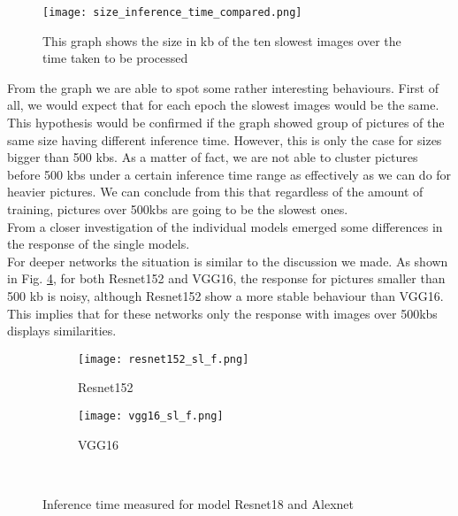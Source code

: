 \begin{figure}[h]
       \centering 
	    \texttt{[image: size\_inference\_time\_compared.png]}
        \caption[Size of the images over inference time]{This graph shows the size in kb of the ten slowest images over the time taken to be processed }
         \label{fig:size_inference_time_compared}
\end{figure}



From the graph we are able to spot some rather interesting behaviours. First of all, we would expect that for each epoch the slowest images would be the same. This hypothesis would be confirmed if the graph showed group of pictures of the same size having different inference time. However, this is only the case for sizes bigger than 500 kbs. As a matter of fact, we are not able to cluster pictures before 500 kbs under a certain inference time range as effectively as we can do for heavier pictures. We can conclude from this that regardless of the amount of training, pictures over 500kbs are going to be the slowest ones. \\
From a closer investigation of the individual models emerged some differences in the response of the single models. \\
For deeper networks the situation is similar to the discussion we made. As shown in Fig. \ref{fig:sl_f_deep}, for both Resnet152 and VGG16, the response for pictures smaller than 500 kb is noisy, although Resnet152 show a more stable behaviour than VGG16. This implies that for these networks only the response with images over 500kbs displays similarities.  
\begin{figure}[h]
     \begin{subfigure}{0.5\textwidth}
	    \texttt{[image: resnet152\_sl\_f.png]}
	    \caption{Resnet152}
         \label{fig:resnet152_sl_f}
         
     \end{subfigure}
     \hfill
     \begin{subfigure}{0.5\textwidth}
	    \texttt{[image: vgg16\_sl\_f.png]}
	    \caption{VGG16}
        \label{fig:vgg16_sl_f}
        
     \end{subfigure}\\
     \caption{Inference time measured for model Resnet18 and Alexnet}
        \label{fig:sl_f_deep}
\end{figure}

